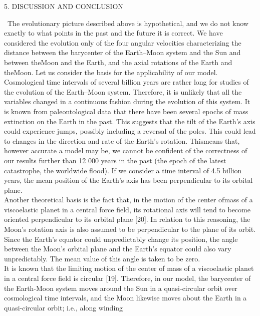 \documentclass[fontsize = 11pt,a4paper]{article}
\begin{document}
\pagebreak
\begin{multicols}{2}
\begin{center}
 5. DISCUSSION AND CONCLUSION
\end{center} 
~\indent The evolutionary picture described above is hypothetical,
and we do not know exactly to what points in
the past and the future it is correct. We have considered
the evolution only of the four angular velocities
characterizing the distance between the barycenter of
the Earth–Moon system and the Sun and between
theMoon and the Earth, and the axial rotations of the
Earth and theMoon. Let us consider the basis for the
applicability of our model.\\
\indent Cosmological time intervals of several billion years
are rather long for studies of the evolution of the
Earth–Moon system. Therefore, it is unlikely that
all the variables changed in a continuous fashion
during the evolution of this system. It is known
from paleontological data that there have been several
epochs of mass extinction on the Earth in the past.
This suggests that the tilt of the Earth’s axis could
experience jumps, possibly including a reversal of the
poles. This could lead to changes in the direction and
rate of the Earth’s rotation. Thismeans that, however
accurate a model may be, we cannot be confident
of the correctness of our results further than 12 000
years in the past (the epoch of the latest catastrophe,
the worldwide flood). If we consider a time interval of
4.5 billion years, the mean position of the Earth’s axis
has been perpendicular to its orbital plane.\\
\indent Another theoretical basis is the fact that, in the
motion of the center ofmass of a viscoelastic planet in
a central force field, its rotational axis will tend to become
oriented perpendicular to its orbital plane [20].
In relation to this reasoning, the Moon’s rotation axis
is also assumed to be perpendicular to the plane of its
orbit. Since the Earth’s equator could unpredictably
change its position, the angle between the Moon’s
orbital plane and the Earth’s equator could also vary
unpredictably. The mean value of this angle is taken
to be zero. \\
\indent  It is known that the limiting motion of the center
of mass of a viscoelastic planet in a central force
field is circular [19]. Therefore, in our model, the
barycenter of the Earth-Moon system moves around
the Sun in a quasi-circular orbit over cosmological
time intervals, and the Moon likewise moves about
the Earth in a quasi-circular orbit; i.e., along winding

\end{multicols}
\end{document}

